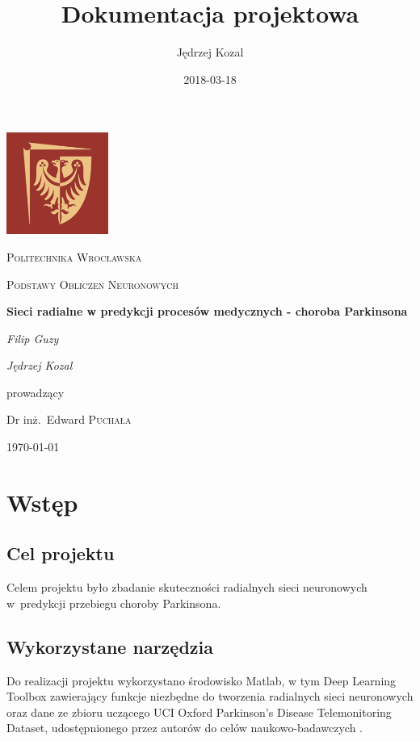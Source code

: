 \documentclass[12pt]{article}
\title{Dokumentacja projektowa}
\date{2018-03-18}
\author{Jędrzej Kozal}
\begin{document}
\begin{titlepage}
	\centering
	\includegraphics[width=0.25\textwidth]{logo_pol_wroclaw.png}\par\vspace{1cm}
	{\scshape\LARGE Politechnika Wrocławska \par}
	\vspace{1cm}
	{\scshape\Large Podstawy Obliczeń Neuronowych\par}
	\vspace{1.5cm}
	{\huge\bfseries Sieci radialne w predykcji procesów medycznych - choroba Parkinsona \par}
	\vspace{2cm}
	{\Large\itshape Filip Guzy\par}
	{\Large\itshape Jędrzej Kozal\par}

	\vfill
	prowadzący\par
	Dr inż.~Edward \textsc{Puchała}

	\vfill

	{\large \today\par}
\end{titlepage}

\tableofcontents
\newpage


\section{Wstęp}

\subsection{Cel projektu}

Celem projektu było zbadanie skuteczności radialnych sieci neuronowych w~predykcji przebiegu choroby Parkinsona.

\subsection{Wykorzystane narzędzia}

Do realizacji projektu wykorzystano środowisko Matlab, w tym Deep Learning Toolbox zawierający funkcje niezbędne do tworzenia radialnych sieci neuronowych oraz dane ze zbioru uczącego UCI Oxford Parkinson's Disease Telemonitoring Dataset, udostępnionego przez autorów do celów naukowo-badawczych \cite{zbioruczacy}. 
\end{document}
